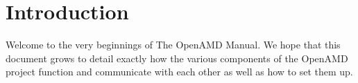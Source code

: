 \chapter{Introduction}

Welcome to the very beginnings of The OpenAMD Manual.
We hope that this document grows to detail exactly how
the various components of the OpenAMD project function
and communicate with each other
as well as how to set them up.
